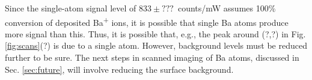 Since the single-atom signal level of {\color{red}$833 \pm ???$}~counts/mW assumes 100\% conversion of deposited Ba\textsuperscript{+} ions, it is possible that single Ba atoms produce more signal than this.  Thus, it is possible that, e.g., the peak around (?,?) in Fig. \ref{fig:scans}(?) is due to a single atom.  However, background levels must be reduced further to be sure.  The next steps in scanned imaging of Ba atoms, discussed in Sec. \ref{sec:future}, will involve reducing the surface background.


